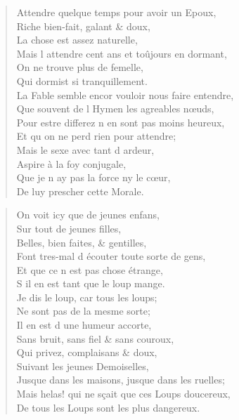 \begin{verse}
Attendre quelque temps pour avoir un Epoux, \\
\vin Riche bien-fait, galant \& doux, \\
\vin La chose est assez naturelle, \\
Mais l\textquotesingle{} attendre cent ans et toûjours en dormant, \\
\vin On ne trouve plus de femelle, \\
\vin Qui dormist si tranquillement. \\
La Fable semble encor vouloir nous faire entendre, \\
Que souvent de l\textquotesingle{} Hymen les agreables nœuds, \\
Pour estre differez n\textquotesingle{} en sont pas moins heureux, \\
\vin Et qu\textquotesingle{} on ne perd rien pour attendre; \\
\vin Mais le sexe avec tant d\textquotesingle{} ardeur, \\
\vin Aspire à la foy conjugale, \\
\vin Que je n\textquotesingle{} ay pas la force ny le cœur, \\
\vin De luy prescher cette Morale.
\end{verse}

\begin{verse}
On voit icy que de jeunes enfans, \\
\vin Sur tout de jeunes filles, \\
\vin Belles, bien faites, \& gentilles, \\
Font tres-mal d\textquotesingle{} écouter toute sorte de gens, \\
\vin Et que ce n\textquotesingle{} est pas chose étrange, \\
\vin S\textquotesingle{} il en est tant que le loup mange. \\
\vin Je dis le loup, car tous les loups; \\
\vin Ne sont pas de la mesme sorte; \\
\vin Il en est d\textquotesingle{} une humeur accorte, \\
\vin Sans bruit, sans fiel \& sans couroux, \\
\vin Qui privez, complaisans \& doux, \\
\vin Suivant les jeunes Demoiselles, \\
Jusque dans les maisons, jusque dans les ruelles; \\
Mais helas! qui ne sçait que ces Loups doucereux, \\
\vin De tous les Loups sont les plus dangereux.
\end{verse}

